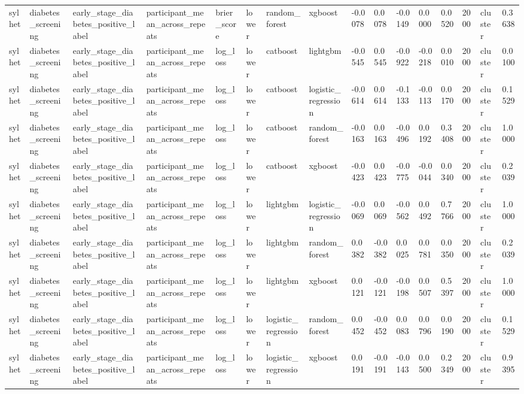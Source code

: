 \begin{tabular}{llllllllllllllll}
sylhet & diabetes\_screening & early\_stage\_diabetes\_positive\_label & participant\_mean\_across\_repeats & brier\_score & lower & random\_forest & xgboost & -0.0078 & 0.0078 & -0.0149 & 0.0000 & 0.0520 & 2000 & cluster & 0.3638 \\
sylhet & diabetes\_screening & early\_stage\_diabetes\_positive\_label & participant\_mean\_across\_repeats & log\_loss & lower & catboost & lightgbm & -0.0545 & 0.0545 & -0.0922 & -0.0218 & 0.0010 & 2000 & cluster & 0.0100 \\
sylhet & diabetes\_screening & early\_stage\_diabetes\_positive\_label & participant\_mean\_across\_repeats & log\_loss & lower & catboost & logistic\_regression & -0.0614 & 0.0614 & -0.1133 & -0.0113 & 0.0170 & 2000 & cluster & 0.1529 \\
sylhet & diabetes\_screening & early\_stage\_diabetes\_positive\_label & participant\_mean\_across\_repeats & log\_loss & lower & catboost & random\_forest & -0.0163 & 0.0163 & -0.0496 & 0.0192 & 0.3408 & 2000 & cluster & 1.0000 \\
sylhet & diabetes\_screening & early\_stage\_diabetes\_positive\_label & participant\_mean\_across\_repeats & log\_loss & lower & catboost & xgboost & -0.0423 & 0.0423 & -0.0775 & -0.0044 & 0.0340 & 2000 & cluster & 0.2039 \\
sylhet & diabetes\_screening & early\_stage\_diabetes\_positive\_label & participant\_mean\_across\_repeats & log\_loss & lower & lightgbm & logistic\_regression & -0.0069 & 0.0069 & -0.0562 & 0.0492 & 0.7766 & 2000 & cluster & 1.0000 \\
sylhet & diabetes\_screening & early\_stage\_diabetes\_positive\_label & participant\_mean\_across\_repeats & log\_loss & lower & lightgbm & random\_forest & 0.0382 & -0.0382 & 0.0025 & 0.0781 & 0.0350 & 2000 & cluster & 0.2039 \\
sylhet & diabetes\_screening & early\_stage\_diabetes\_positive\_label & participant\_mean\_across\_repeats & log\_loss & lower & lightgbm & xgboost & 0.0121 & -0.0121 & -0.0198 & 0.0507 & 0.5397 & 2000 & cluster & 1.0000 \\
sylhet & diabetes\_screening & early\_stage\_diabetes\_positive\_label & participant\_mean\_across\_repeats & log\_loss & lower & logistic\_regression & random\_forest & 0.0452 & -0.0452 & 0.0083 & 0.0796 & 0.0190 & 2000 & cluster & 0.1529 \\
sylhet & diabetes\_screening & early\_stage\_diabetes\_positive\_label & participant\_mean\_across\_repeats & log\_loss & lower & logistic\_regression & xgboost & 0.0191 & -0.0191 & -0.0143 & 0.0500 & 0.2349 & 2000 & cluster & 0.9395 \\

\end{tabular}

